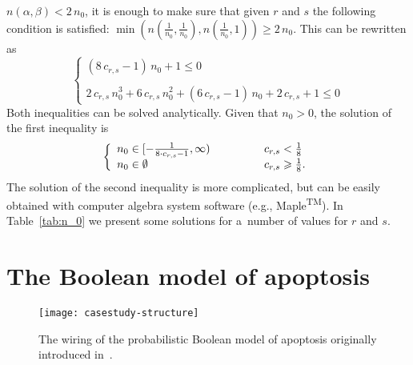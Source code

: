\documentclass[runningheads,a4paper]{llncs}
\begin{document}
$n(\alpha,\beta)<2\,n_0$, it is enough to make sure that given $r$ and $s$ the following condition
is satisfied:
$\min(n(\frac{1}{n_0},\frac{1}{n_0}),n(\frac{1}{n_0},1)) \geqslant 2\,n_0$.
This can be rewritten as
\begin{equation*}
\left\{\begin{array}{l}
(8\,c_{r,s}-1)\,n_0 + 1 \leq 0\\\\
2\,c_{r,s}\,n_0^3+6\,c_{r,s}\,n_0^2+(6\,c_{r,s}-1)\,n_0+2\,c_{r,s}+1 \leq 0
\end{array}
\right.
\end{equation*}
Both inequalities can be solved analytically. Given that $n_0>0$, the solution of the first
inequality is
\begin{equation}
\left\{\begin{array}{lp{1cm}l}
n_0 \in [-\frac{1}{8\cdot c_{r,s}-1},\infty) & & c_{r,s} < \frac{1}{8}\\
n_0 \in \emptyset & & c_{r,s} \geqslant \frac{1}{8}.
\end{array}
\right.
\end{equation}
The solution of the second inequality is more complicated, but can be easily obtained with
computer algebra system software (e.g., Maple\textsuperscript{\tiny TM}). In Table~\ref{tab:n_0}
we present some solutions for a~number of values for $r$ and $s$.

\newpage

\section{The Boolean model of apoptosis}
\label{app:apoptosis_model}

\begin{figure}[!h]
\centering
\texttt{[image: casestudy-structure]}
\caption{The wiring of the probabilistic Boolean model of apoptosis originally introduced
in~\cite{TMPTS14}.}
\label{fig:structure}
\end{figure}
\end{document}
